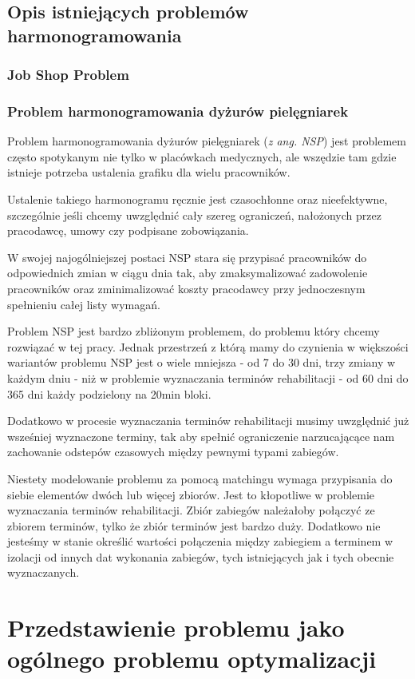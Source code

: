 \section{Opis istniejących problemów harmonogramowania}
\subsection{Job Shop Problem}
\subsection{Problem harmonogramowania dyżurów pielęgniarek}
Problem harmonogramowania dyżurów pielęgniarek\cite{nurseScheduling} (\emph{z ang. NSP}) jest problemem często spotykanym nie tylko w placówkach medycznych, ale
wszędzie tam gdzie istnieje potrzeba ustalenia grafiku dla wielu pracowników.

Ustalenie takiego harmonogramu ręcznie jest czasochłonne oraz nieefektywne,
szczególnie jeśli chcemy uwzględnić cały szereg ograniczeń, nałożonych przez
pracodawcę, umowy czy podpisane zobowiązania.

W swojej najogólniejszej postaci NSP stara się przypisać pracowników do
odpowiednich zmian w ciągu dnia tak, aby zmaksymalizować zadowolenie pracowników
oraz zminimalizować koszty pracodawcy przy jednoczesnym spełnieniu całej listy
wymagań.

Problem NSP jest bardzo zbliżonym problemem, do problemu który chcemy rozwiązać
w tej pracy. Jednak przestrzeń z którą mamy do czynienia w większości wariantów problemu NSP jest o wiele mniejsza - od 7 do 30 dni, trzy zmiany w każdym dniu - niż w problemie wyznaczania terminów rehabilitacji - od 60 dni do 365 dni każdy podzielony na 20min bloki.

Dodatkowo w procesie wyznaczania terminów rehabilitacji musimy uwzględnić już wsześniej wyznaczone terminy, tak aby spełnić ograniczenie narzucającące nam zachowanie odstepów czasowych między pewnymi typami zabiegów.

Niestety modelowanie problemu za pomocą matchingu wymaga przypisania do
siebie elementów dwóch lub więcej zbiorów. Jest to kłopotliwe w problemie wyznaczania
terminów rehabilitacji. Zbiór zabiegów należałoby połączyć ze zbiorem
terminów, tylko że zbiór terminów jest bardzo duży. Dodatkowo nie jesteśmy w
stanie określić wartości połączenia między zabiegiem a terminem w
izolacji od innych dat wykonania zabiegów, tych istniejących jak i tych
obecnie wyznaczanych.

\chapter{Przedstawienie problemu jako ogólnego problemu optymalizacji}
